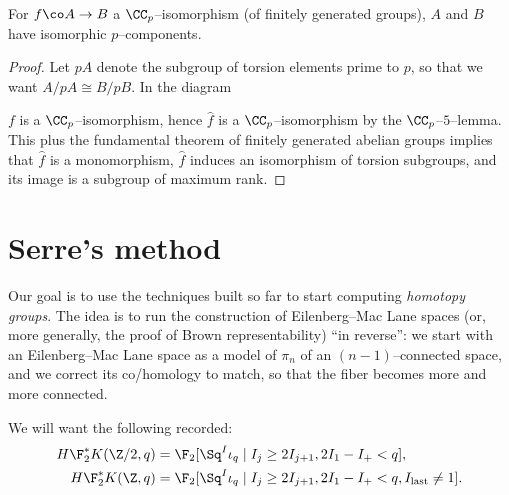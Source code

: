 \begin{lemma}\label{Approx7}
For $f\co A \to B$ a $\CC_p$--isomorphism (of finitely generated groups), $A$ and $B$ have isomorphic $p$--components.
\end{lemma}
\begin{proof}
Let $pA$ denote the subgroup of torsion elements prime to $p$, so that we want $A / pA \cong B / pB$.  In the diagram
\begin{center}
\end{center}
$f$ is a $\CC_p$--isomorphism, hence $\widehat f$ is a $\CC_p$--isomorphism by the $\CC_p$--$5$--lemma.  This plus the fundamental theorem of finitely generated abelian groups implies that $\widehat f$ is a monomorphism, $\widehat f$ induces an isomorphism of torsion subgroups, and its image is a subgroup of maximum rank.
\end{proof}




\section{Serre's method}

Our goal is to use the techniques built so far to start computing \emph{homotopy groups}.  The idea is to run the construction of Eilenberg--Mac Lane spaces (or, more generally, the proof of Brown representability) ``in reverse'': we start with an Eilenberg--Mac Lane space as a model of $\pi_n$ of an $(n-1)$--connected space, and we correct its co/homology to match, so that the fiber becomes more and more connected.

We will want the following recorded:
\begin{align*}
H\F_2^* K(\Z/2, q) & = \F_2[\Sq^I \iota_q \mid I_j \ge 2 I_{j+1}, 2 I_1 - I_+ < q], \\
H\F_2^* K(\Z, q) & = \F_2[\Sq^I \iota_q \mid I_j \ge 2 I_{j+1}, 2I_1 - I_+ < q, I_{\text{last}} \ne 1].
\end{align*}

